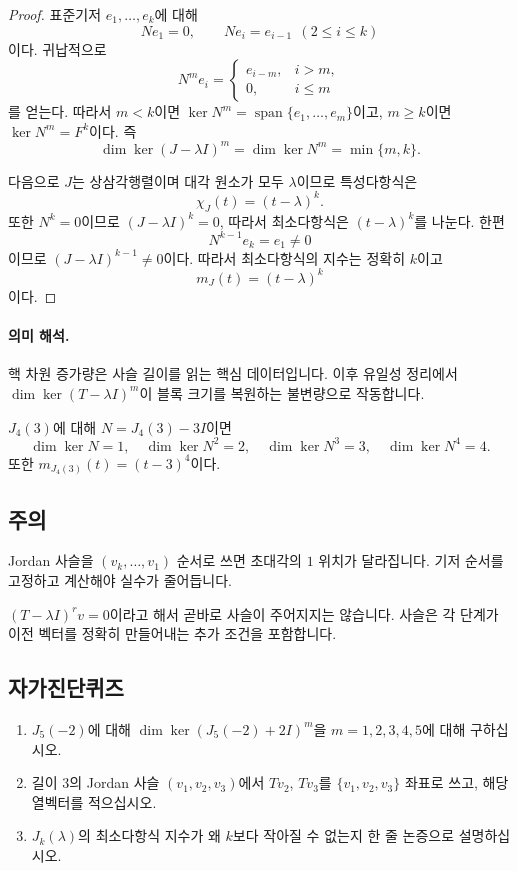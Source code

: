 \begin{proof}
표준기저 $e_1,\dots,e_k$에 대해
$$
Ne_1=0,\qquad Ne_i=e_{i-1}\ \ (2\le i\le k)
$$
이다. 귀납적으로
$$
N^m e_i=
\begin{cases}
e_{i-m},& i>m,\\
0,& i\le m
\end{cases}
$$
를 얻는다. 따라서 $m<k$이면 $\ker N^m=\operatorname{span}\{e_1,\dots,e_m\}$이고, $m\ge k$이면 $\ker N^m=F^k$이다. 즉
$$
\dim\ker (J-\lambda I)^m=\dim\ker N^m=\min\{m,k\}.
$$

다음으로 $J$는 상삼각행렬이며 대각 원소가 모두 $\lambda$이므로 특성다항식은
$$
\chi_J(t)=(t-\lambda)^k.
$$
또한 $N^k=0$이므로 $(J-\lambda I)^k=0$, 따라서 최소다항식은 $(t-\lambda)^k$를 나눈다. 한편
$$
N^{k-1}e_k=e_1\neq0
$$
이므로 $(J-\lambda I)^{k-1}\neq0$이다. 따라서 최소다항식의 지수는 정확히 $k$이고
$$
m_J(t)=(t-\lambda)^k
$$
이다.
\end{proof}

\paragraph{의미 해석.}
핵 차원 증가량은 사슬 길이를 읽는 핵심 데이터입니다. 이후 유일성 정리에서 $\dim\ker(T-\lambda I)^m$이 블록 크기를 복원하는 불변량으로 작동합니다.

\begin{example}
$J_4(3)$에 대해 $N=J_4(3)-3I$이면
$$
\dim\ker N=1,\quad \dim\ker N^2=2,\quad \dim\ker N^3=3,\quad \dim\ker N^4=4.
$$
또한 $m_{J_4(3)}(t)=(t-3)^4$이다.
\end{example}

\subsection*{주의}
\begin{warning}
Jordan 사슬을 $(v_k,\dots,v_1)$ 순서로 쓰면 초대각의 $1$ 위치가 달라집니다. 기저 순서를 고정하고 계산해야 실수가 줄어듭니다.
\end{warning}
\begin{warning}
$(T-\lambda I)^r v=0$이라고 해서 곧바로 사슬이 주어지지는 않습니다. 사슬은 각 단계가 이전 벡터를 정확히 만들어내는 추가 조건을 포함합니다.
\end{warning}

\subsection*{자가진단퀴즈}
\begin{enumerate}[label=\arabic*.]
\item $J_5(-2)$에 대해 $\dim\ker(J_5(-2)+2I)^m$을 $m=1,2,3,4,5$에 대해 구하십시오.
\item 길이 $3$의 Jordan 사슬 $(v_1,v_2,v_3)$에서 $Tv_2$, $Tv_3$를 $\{v_1,v_2,v_3\}$ 좌표로 쓰고, 해당 열벡터를 적으십시오.
\item $J_k(\lambda)$의 최소다항식 지수가 왜 $k$보다 작아질 수 없는지 한 줄 논증으로 설명하십시오.
\end{enumerate}

